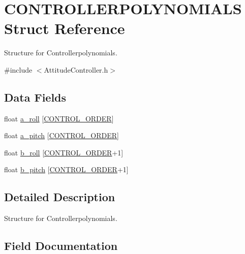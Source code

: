 \hypertarget{struct_c_o_n_t_r_o_l_l_e_r_p_o_l_y_n_o_m_i_a_l_s}{}\section{C\+O\+N\+T\+R\+O\+L\+L\+E\+R\+P\+O\+L\+Y\+N\+O\+M\+I\+A\+LS Struct Reference}
\label{struct_c_o_n_t_r_o_l_l_e_r_p_o_l_y_n_o_m_i_a_l_s}


Structure for Controllerpolynomials.  




{\ttfamily \#include $<$Attitude\+Controller.\+h$>$}

\subsection*{Data Fields}
\begin{DoxyCompactItemize}
\item 
float \hyperlink{struct_c_o_n_t_r_o_l_l_e_r_p_o_l_y_n_o_m_i_a_l_s_a5b4163a44a0cad32b8b2b1176c8ea348}{a\+\_\+roll} \mbox{[}\hyperlink{_attitude_controller_8h_aa99297ee655bea40e34535eeeb6eec96}{C\+O\+N\+T\+R\+O\+L\+\_\+\+O\+R\+D\+ER}\mbox{]}
\item 
float \hyperlink{struct_c_o_n_t_r_o_l_l_e_r_p_o_l_y_n_o_m_i_a_l_s_a624d3a2fdb8981efa16dfb5ef46141c2}{a\+\_\+pitch} \mbox{[}\hyperlink{_attitude_controller_8h_aa99297ee655bea40e34535eeeb6eec96}{C\+O\+N\+T\+R\+O\+L\+\_\+\+O\+R\+D\+ER}\mbox{]}
\item 
float \hyperlink{struct_c_o_n_t_r_o_l_l_e_r_p_o_l_y_n_o_m_i_a_l_s_a0f00d49108517a7db4edcccf44c59282}{b\+\_\+roll} \mbox{[}\hyperlink{_attitude_controller_8h_aa99297ee655bea40e34535eeeb6eec96}{C\+O\+N\+T\+R\+O\+L\+\_\+\+O\+R\+D\+ER}+1\mbox{]}
\item 
float \hyperlink{struct_c_o_n_t_r_o_l_l_e_r_p_o_l_y_n_o_m_i_a_l_s_af6dc4b138201fd55751b5e425fa17d90}{b\+\_\+pitch} \mbox{[}\hyperlink{_attitude_controller_8h_aa99297ee655bea40e34535eeeb6eec96}{C\+O\+N\+T\+R\+O\+L\+\_\+\+O\+R\+D\+ER}+1\mbox{]}
\end{DoxyCompactItemize}


\subsection{Detailed Description}
Structure for Controllerpolynomials. 

\subsection{Field Documentation}
